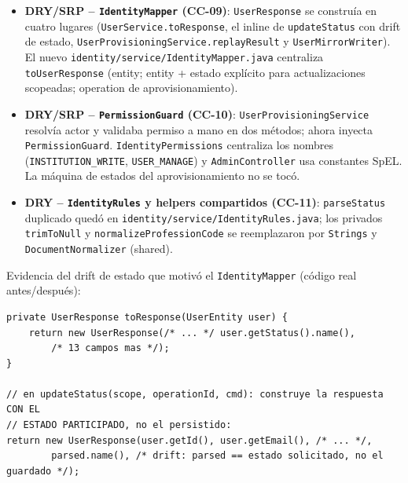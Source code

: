 \documentclass[11pt,a4paper]{article}
\begin{document}
\begin{itemize}
  \item \textbf{DRY/SRP -- \texttt{IdentityMapper} (CC-09)}:
        \texttt{UserResponse} se construía en cuatro lugares
        (\texttt{UserService.toResponse}, el inline de \texttt{updateStatus} con
        drift de estado, \texttt{UserProvisioningService.replayResult} y
        \texttt{UserMirrorWriter}). El nuevo
        \texttt{identity/service/IdentityMapper.java} centraliza
        \texttt{toUserResponse} (entity; entity + estado explícito para
        actualizaciones scopeadas; operation de aprovisionamiento).
  \item \textbf{DRY/SRP -- \texttt{PermissionGuard} (CC-10)}:
        \texttt{UserProvisioningService} resolvía actor y validaba permiso a
        mano en dos métodos; ahora inyecta \texttt{PermissionGuard}.
        \texttt{IdentityPermissions} centraliza los nombres
        (\texttt{INSTITUTION\_WRITE}, \texttt{USER\_MANAGE}) y
        \texttt{AdminController} usa constantes SpEL. La máquina de estados del
        aprovisionamiento no se tocó.
  \item \textbf{DRY -- \texttt{IdentityRules} y helpers compartidos (CC-11)}:
        \texttt{parseStatus} duplicado quedó en
        \texttt{identity/service/IdentityRules.java}; los privados
        \texttt{trimToNull} y \texttt{normalizeProfessionCode} se reemplazaron
        por \texttt{Strings} y \texttt{DocumentNormalizer} (shared).
\end{itemize}

Evidencia del drift de estado que motivó el \texttt{IdentityMapper} (código real
antes/después):

\begin{lstlisting}[caption={UserService.java (antes) --- mapeo inline con drift en updateStatus}]
private UserResponse toResponse(UserEntity user) {
    return new UserResponse(/* ... */ user.getStatus().name(),
        /* 13 campos mas */);
}

// en updateStatus(scope, operationId, cmd): construye la respuesta CON EL
// ESTADO PARTICIPADO, no el persistido:
return new UserResponse(user.getId(), user.getEmail(), /* ... */,
        parsed.name(), /* drift: parsed == estado solicitado, no el guardado */);
\end{lstlisting}
\end{document}
